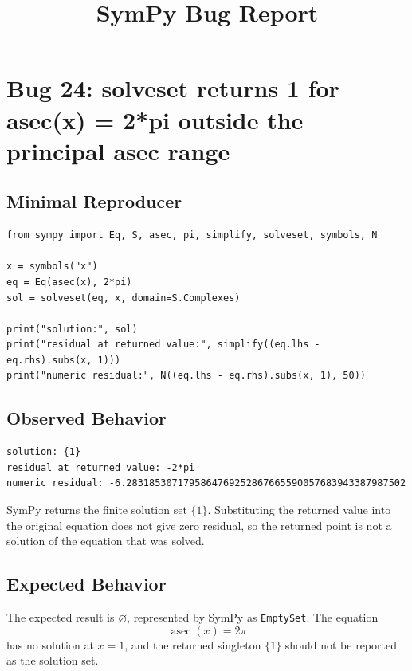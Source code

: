 \documentclass[11pt]{article}
\title{SymPy Bug Report}
\author{}
\date{}
\begin{document}
\maketitle

\section{Bug 24: solveset returns 1 for asec(x) = 2*pi outside the principal asec range}

\subsection{Minimal Reproducer}

\medskip

\begin{lstlisting}[style=bugpython]
from sympy import Eq, S, asec, pi, simplify, solveset, symbols, N

x = symbols("x")
eq = Eq(asec(x), 2*pi)
sol = solveset(eq, x, domain=S.Complexes)

print("solution:", sol)
print("residual at returned value:", simplify((eq.lhs - eq.rhs).subs(x, 1)))
print("numeric residual:", N((eq.lhs - eq.rhs).subs(x, 1), 50))
\end{lstlisting}

\subsection{Observed Behavior}

\medskip

\begin{lstlisting}[style=bugpython]
solution: {1}
residual at returned value: -2*pi
numeric residual: -6.2831853071795864769252867665590057683943387987502
\end{lstlisting}

SymPy returns the finite solution set \(\{1\}\).  Substituting the returned
value into the original equation does not give zero residual, so the returned
point is not a solution of the equation that was solved.

\subsection{Expected Behavior}

The expected result is \(\varnothing\), represented by SymPy as
\texttt{EmptySet}.  The equation
\[
  \operatorname{asec}(x) = 2\pi
\]
has no solution at \(x=1\), and the returned singleton \(\{1\}\) should not be
reported as the solution set.
\end{document}
